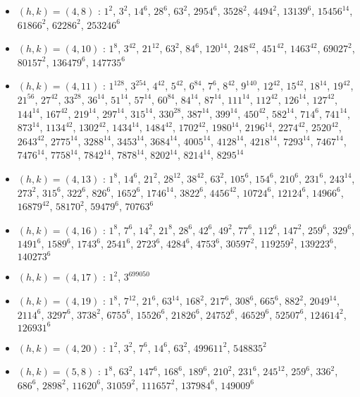 \begin{itemize}
\item $(h,k)=(4,8)$ : $1^{2}$, $3^{2}$, $14^{6}$, $28^{6}$, $63^{2}$, $2954^{6}$, $3528^{2}$, $4494^{2}$, $13139^{6}$, $15456^{14}$, $61866^{2}$, $62286^{2}$, $253246^{6}$
\item $(h,k)=(4,10)$ : $1^{8}$, $3^{42}$, $21^{12}$, $63^{2}$, $84^{6}$, $120^{14}$, $248^{42}$, $451^{42}$, $1463^{42}$, $69027^{2}$, $80157^{2}$, $136479^{6}$, $147735^{6}$
\item $(h,k)=(4,11)$ : $1^{128}$, $3^{254}$, $4^{42}$, $5^{42}$, $6^{84}$, $7^{6}$, $8^{42}$, $9^{140}$, $12^{42}$, $15^{42}$, $18^{14}$, $19^{42}$, $21^{56}$, $27^{42}$, $33^{28}$, $36^{14}$, $51^{14}$, $57^{14}$, $60^{84}$, $84^{14}$, $87^{14}$, $111^{14}$, $112^{42}$, $126^{14}$, $127^{42}$, $144^{14}$, $167^{42}$, $219^{14}$, $297^{14}$, $315^{14}$, $330^{28}$, $387^{14}$, $399^{14}$, $450^{42}$, $582^{14}$, $714^{6}$, $741^{14}$, $873^{14}$, $1134^{42}$, $1302^{42}$, $1434^{14}$, $1484^{42}$, $1702^{42}$, $1980^{14}$, $2196^{14}$, $2274^{42}$, $2520^{42}$, $2643^{42}$, $2775^{14}$, $3288^{14}$, $3453^{14}$, $3684^{14}$, $4005^{14}$, $4128^{14}$, $4218^{14}$, $7293^{14}$, $7467^{14}$, $7476^{14}$, $7758^{14}$, $7842^{14}$, $7878^{14}$, $8202^{14}$, $8214^{14}$, $8295^{14}$
\item $(h,k)=(4,13)$ : $1^{8}$, $14^{6}$, $21^{2}$, $28^{12}$, $38^{42}$, $63^{2}$, $105^{6}$, $154^{6}$, $210^{6}$, $231^{6}$, $243^{14}$, $273^{2}$, $315^{6}$, $322^{6}$, $826^{6}$, $1652^{6}$, $1746^{14}$, $3822^{6}$, $4456^{42}$, $10724^{6}$, $12124^{6}$, $14966^{6}$, $16879^{42}$, $58170^{2}$, $59479^{6}$, $70763^{6}$
\item $(h,k)=(4,16)$ : $1^{8}$, $7^{6}$, $14^{2}$, $21^{8}$, $28^{6}$, $42^{6}$, $49^{2}$, $77^{6}$, $112^{6}$, $147^{2}$, $259^{6}$, $329^{6}$, $1491^{6}$, $1589^{6}$, $1743^{6}$, $2541^{6}$, $2723^{6}$, $4284^{6}$, $4753^{6}$, $30597^{2}$, $119259^{2}$, $139223^{6}$, $140273^{6}$
\item $(h,k)=(4,17)$ : $1^{2}$, $3^{699050}$
\item $(h,k)=(4,19)$ : $1^{8}$, $7^{12}$, $21^{6}$, $63^{14}$, $168^{2}$, $217^{6}$, $308^{6}$, $665^{6}$, $882^{2}$, $2049^{14}$, $2114^{6}$, $3297^{6}$, $3738^{2}$, $6755^{6}$, $15526^{6}$, $21826^{6}$, $24752^{6}$, $46529^{6}$, $52507^{6}$, $124614^{2}$, $126931^{6}$
\item $(h,k)=(4,20)$ : $1^{2}$, $3^{2}$, $7^{6}$, $14^{6}$, $63^{2}$, $499611^{2}$, $548835^{2}$
\item $(h,k)=(5,8)$ : $1^{8}$, $63^{2}$, $147^{6}$, $168^{6}$, $189^{6}$, $210^{2}$, $231^{6}$, $245^{12}$, $259^{6}$, $336^{2}$, $686^{6}$, $2898^{2}$, $11620^{6}$, $31059^{2}$, $111657^{2}$, $137984^{6}$, $149009^{6}$

\end{itemize}
